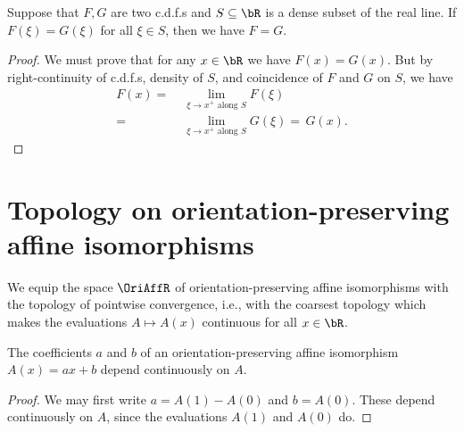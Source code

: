 \begin{lemma}
  \label{lem:cdf-equal-on-dense}
  \leanok
  Suppose that $F,G$ are two c.d.f.s and $S \subseteq \bR$ is a dense
  subset of the real line. If $F(\xi) = G(\xi)$ for all $\xi \in S$,
  then we have $F = G$.
\end{lemma}
\begin{proof}
  \uses{}
  \leanok
  We must prove that for any $x \in \bR$ we have $F(x) = G(x)$.
  But by right-continuity of c.d.f.s, density of $S$, and coincidence of
  $F$ and $G$ on $S$, we have
  \begin{align*}
      F(x)
    = \; & \lim_{\xi \to x^+ \text{ along $S$}} F(\xi) \\
    = \; & \lim_{\xi \to x^+ \text{ along $S$}} G(\xi)
    = \, G(x) .
  \end{align*}
\end{proof}



\section{Topology on orientation-preserving affine isomorphisms}

\begin{definition}[]
  \label{def:affine-transform-topology}
  \leanok
  We equip the space $\OriAffR$ of orientation-preserving affine isomorphisms
  with the topology of pointwise convergence, i.e., with the
  coarsest topology which makes the evaluations $A \mapsto A(x)$ continuous
  for all $x \in \bR$.
\end{definition}

\begin{lemma}
  \label{lem:affine-coefficients-continuous}
  \leanok
  The coefficients $a$ and $b$ of an orientation-preserving affine isomorphism
  $A(x) = a x + b$ depend continuously on $A$.
\end{lemma}
\begin{proof}
  We may first write $a = A(1) - A(0)$ and $b = A(0)$.
  These depend continuously on $A$,
  since the evaluations $A(1)$ and $A(0)$ do.
\end{proof}

